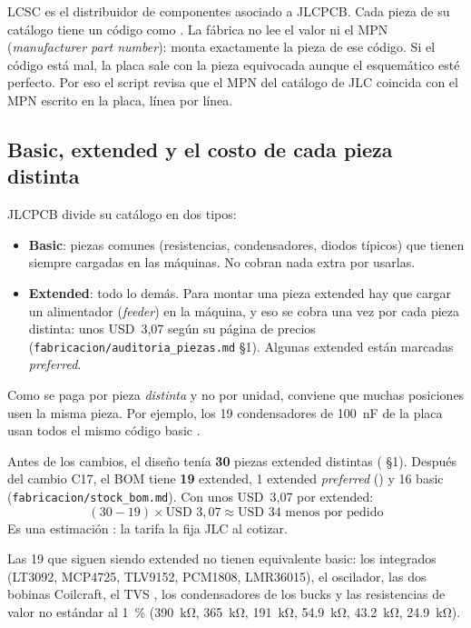 \begin{idea}
LCSC es el distribuidor de componentes asociado a JLCPCB. Cada pieza de su catálogo tiene un código como . La fábrica no lee el valor ni el MPN (\emph{manufacturer part number}): monta exactamente la pieza de ese código. Si el código está mal, la placa sale con la pieza equivocada aunque el esquemático esté perfecto. Por eso el script  revisa que el MPN del catálogo de JLC coincida con el MPN escrito en la placa, línea por línea.
\end{idea}

\subsection{Basic, extended y el costo de cada pieza distinta}

JLCPCB divide su catálogo en dos tipos:
\begin{itemize}
  \item \textbf{Basic}: piezas comunes (resistencias, condensadores, diodos típicos) que tienen siempre cargadas en las máquinas. No cobran nada extra por usarlas.
  \item \textbf{Extended}: todo lo demás. Para montar una pieza extended hay que cargar un alimentador (\emph{feeder}) en la máquina, y eso se cobra una vez por cada pieza distinta: unos USD~3,07 según su página de precios (\nolinkurl{fabricacion/auditoria_piezas.md} §1). Algunas extended están marcadas \emph{preferred}.
\end{itemize}

Como se paga por pieza \emph{distinta} y no por unidad, conviene que muchas posiciones usen la misma pieza. Por ejemplo, los 19 condensadores de \SI{100}{\nano\farad} de la placa usan todos el mismo código basic .

\begin{calculo}
Antes de los cambios, el diseño tenía \textbf{30} piezas extended distintas ( §1). Después del cambio C17, el BOM tiene \textbf{19} extended, 1 extended \emph{preferred} () y 16 basic (\nolinkurl{fabricacion/stock_bom.md}). Con unos USD~3,07 por extended:
\[
(30-19)\times\text{USD }3{,}07\approx\text{USD }34 \text{ menos por pedido}
\]
Es una estimación \estimado: la tarifa la fija JLC al cotizar.
\end{calculo}

Las 19 que siguen siendo extended no tienen equivalente basic: los integrados (LT3092, MCP4725, TLV9152, PCM1808, LMR36015), el oscilador, las dos bobinas Coilcraft, el TVS , los condensadores de los bucks y las resistencias de valor no estándar al \SI{1}{\percent} (\SI{390}{\kilo\ohm}, \SI{365}{\kilo\ohm}, \SI{191}{\kilo\ohm}, \SI{54.9}{\kilo\ohm}, \SI{43.2}{\kilo\ohm}, \SI{24.9}{\kilo\ohm}).

